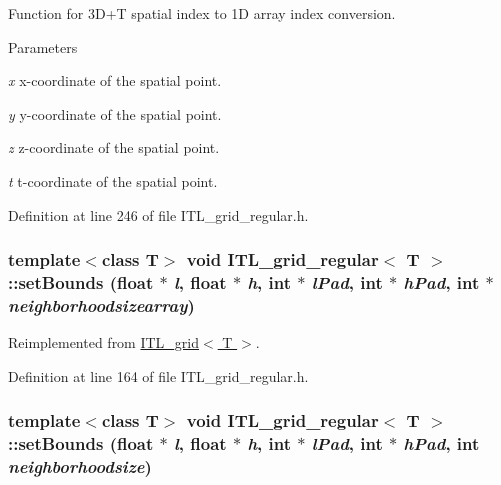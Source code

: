Function for 3D+T spatial index to 1D array index conversion. 


\begin{DoxyParams}{Parameters}
\item[{\em x}]x-\/coordinate of the spatial point. \item[{\em y}]y-\/coordinate of the spatial point. \item[{\em z}]z-\/coordinate of the spatial point. \item[{\em t}]t-\/coordinate of the spatial point. \end{DoxyParams}


Definition at line 246 of file ITL\_\-grid\_\-regular.h.

\hypertarget{classITL__grid__regular_a324d135ffc7a8e3dab70933f036c7e5a}{
\subsubsection[{setBounds}]{\setlength{\rightskip}{0pt plus 5cm}template$<$class T$>$ void {\bf ITL\_\-grid\_\-regular}$<$ T $>$::setBounds (float $\ast$ {\em l}, \/  float $\ast$ {\em h}, \/  int $\ast$ {\em lPad}, \/  int $\ast$ {\em hPad}, \/  int $\ast$ {\em neighborhoodsizearray})}}
\label{classITL__grid__regular_a324d135ffc7a8e3dab70933f036c7e5a}


Reimplemented from \hyperlink{classITL__grid_aacc7102ddeec002827256c267b7eac38}{ITL\_\-grid$<$ T $>$}.



Definition at line 164 of file ITL\_\-grid\_\-regular.h.

\hypertarget{classITL__grid__regular_ac64d7fd91b4330f961979a6d7127d9f6}{
\subsubsection[{setBounds}]{\setlength{\rightskip}{0pt plus 5cm}template$<$class T$>$ void {\bf ITL\_\-grid\_\-regular}$<$ T $>$::setBounds (float $\ast$ {\em l}, \/  float $\ast$ {\em h}, \/  int $\ast$ {\em lPad}, \/  int $\ast$ {\em hPad}, \/  int {\em neighborhoodsize})}}
\label{classITL__grid__regular_ac64d7fd91b4330f961979a6d7127d9f6}


